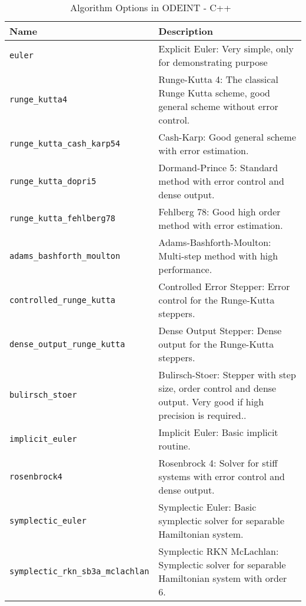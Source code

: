 \begin{table}[ht]
\begin{tabular}{ p{} p{} }
	\textbf{Name} & \textbf{Description} \\
	\toprule
	\verb|euler| & Explicit Euler: Very simple, only for demonstrating purpose\\ \hline
	\verb|runge_kutta4| & Runge-Kutta 4: The classical Runge Kutta scheme, good general scheme without error control.\\ \hline
	\verb|runge_kutta_cash_karp54| & Cash-Karp: Good general scheme with error estimation.\\ \hline
	\verb|runge_kutta_dopri5| & Dormand-Prince 5: Standard method with error control and dense output.\\ \hline
	\verb|runge_kutta_fehlberg78| & Fehlberg 78: Good high order method with error estimation.\\ \hline

	\verb|adams_bashforth_moulton| & Adams-Bashforth-Moulton: Multi-step method with high performance.\\ \hline
	\verb|controlled_runge_kutta| & Controlled Error Stepper: Error control for the Runge-Kutta steppers.\\ \hline
	\verb|dense_output_runge_kutta| & Dense Output Stepper: Dense output for the Runge-Kutta steppers.\\ \hline
	\verb|bulirsch_stoer| & Bulirsch-Stoer: Stepper with step size, order control and dense output. Very good if high precision is required..\\ \hline
	\verb|implicit_euler| & Implicit Euler: Basic implicit routine.\\ \hline
	\verb|rosenbrock4| & Rosenbrock 4: Solver for stiff systems with error control and dense output.\\ \hline
	\verb|symplectic_euler| & Symplectic Euler: Basic symplectic solver for separable Hamiltonian system.\\ \hline
	\verb|symplectic_rkn_sb3a_mclachlan| & Symplectic RKN McLachlan: Symplectic solver for separable Hamiltonian system with order 6.\\
	\bottomrule	
\end{tabular}	
\caption{Algorithm Options in ODEINT - C++~\citep{odeintfun}}	
\label{tab_algodeint}
\end{table}
